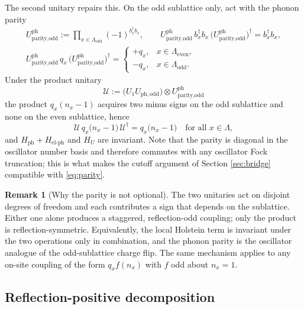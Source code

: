 \documentclass[11pt]{article}
\numberwithin{equation}{section}
\newcommand{\Lamb}{\Lambda}
\newcommand{\ph}{\mathrm{ph}}
\theoremstyle{definition}
\newtheorem{remark}[theorem]{Remark}
\begin{document}
The second unitary repairs this. On the odd sublattice only, act with the phonon
parity
\begin{equation}
\begin{gathered}
U^{\ph}_{\text{parity,odd}}:=\prod_{x\in\Lamb_{\text{odd}}}(-1)^{b_{x}^{\dagger}b_{x}},
\qquad
U^{\ph}_{\text{parity,odd}}\,b_{x}^{\dagger}b_{x}\,\big(U^{\ph}_{\text{parity,odd}}\big)^{\dagger}=b_{x}^{\dagger}b_{x},\\
U^{\ph}_{\text{parity,odd}}\,q_{x}\,\big(U^{\ph}_{\text{parity,odd}}\big)^{\dagger}
=\begin{cases}+q_{x},&x\in\Lamb_{\text{even}},\\ -q_{x},&x\in\Lamb_{\text{odd}}.\end{cases}
\end{gathered}
\label{eq:parity}
\end{equation}
Under the product unitary
\begin{equation}
\mathcal{U}:=\big(U_{1}U_{\ph,\text{odd}}\big)\otimes U^{\ph}_{\text{parity,odd}}
\label{eq:U}
\end{equation}
the product $q_{x}(n_{x}-1)$ acquires two minus signs on the odd sublattice and none on
the even sublattice, hence
\begin{equation}
\mathcal{U}\,q_{x}\big(n_{x}-1\big)\,\mathcal{U}^{\dagger}=q_{x}\big(n_{x}-1\big)
\quad\text{for all }x\in\Lamb,
\label{eq:invariant}
\end{equation}
and $H_{\ph}+H_{\text{el-ph}}$ and $H_{U}$ are invariant. Note that the parity is
diagonal in the oscillator number basis and therefore commutes with any oscillator
Fock truncation; this is what makes the cutoff argument of Section \ref{sec:bridge}
compatible with \eqref{eq:parity}.

\begin{remark}[Why the parity is not optional]\label{rem:parity}
The two unitaries act on disjoint degrees of freedom and each contributes a sign that
depends on the sublattice. Either one alone produces a staggered, reflection-odd
coupling; only the product is reflection-symmetric. Equivalently, the local Holstein
term is invariant under the two operations only in combination, and the phonon parity
is the oscillator analogue of the odd-sublattice charge flip. The same mechanism
applies to any on-site coupling of the form $q_{x}f(n_{x})$ with $f$ odd about
$n_{x}=1$.
\end{remark}

\subsection{Reflection-positive decomposition}
\end{document}
